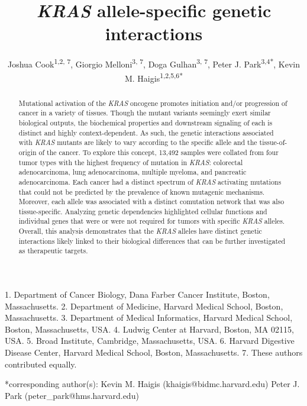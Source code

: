 \documentclass[english, 10pt, letterpaper]{article}
\title{\emph{KRAS} allele-specific genetic interactions}
\author{
    Joshua Cook\textsuperscript{1,2, 7},
    Giorgio Melloni\textsuperscript{3, 7}, 
    Doga Gulhan\textsuperscript{3, 7}, 
    Peter J. Park\textsuperscript{3,4{*}}, 
    Kevin M. Haigis\textsuperscript{1,2,5,6{*}}
}
\newcommand{\KRAS}{\emph{KRAS}}
\begin{document}

\maketitle

\thispagestyle{fancy}

1. Department of Cancer Biology, Dana Farber Cancer Institute, Boston, Massachusetts.
2. Department of Medicine, Harvard Medical School, Boston, Massachusetts.
3. Department of Medical Informatics, Harvard Medical School, Boston, Massachusetts, USA.
4. Ludwig Center at Harvard, Boston, MA 02115, USA.
5. Broad Institute, Cambridge, Massachusetts, USA.
6. Harvard Digestive Disease Center, Harvard Medical School, Boston, Massachusetts.
7. These authors contributed equally.

{*}corresponding author(s):
\newline{} \hspace*{1cm} Kevin M. Haigis (khaigis@bidmc.harvard.edu)
\newline{} \hspace*{1cm} Peter J. Park (peter\_park@hms.harvard.edu)

\begin{abstract}
Mutational activation of the \KRAS{} oncogene promotes initiation and/or progression of cancer in a variety of tissues.
Though the mutant variants seemingly exert similar biological outputs, the biochemical properties and downstream signaling  of each is distinct and highly context-dependent.
As such, the genetic interactions associated with \KRAS{} mutants are likely to vary according to the specific allele and the tissue-of-origin of the cancer.
To explore this concept, 13,492 samples were collated from four tumor types with the highest frequency of mutation in \KRAS{}: colorectal adenocarcinoma, lung adenocarcinoma, multiple myeloma, and pancreatic adenocarcinoma.
Each cancer had a distinct spectrum of \KRAS{} activating mutations that could not be predicted by the prevalence of known mutagenic mechanisms.
Moreover, each allele was associated with a distinct comutation network that was also tissue-specific.
Analyzing genetic dependencies highlighted cellular functions and individual genes that were or were not required for tumors with specific \KRAS{} alleles.
Overall, this analysis demonstrates that the \KRAS{} alleles have distinct genetic interactions likely linked to their biological differences that can be further investigated as therapeutic targets.
\end{abstract}
\end{document}
